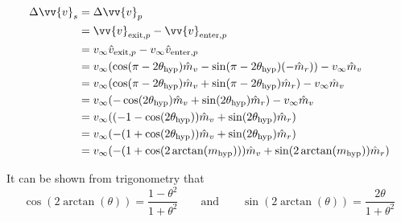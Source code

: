 \documentclass[../main.tex]{subfiles}
\begin{document}
\begin{align*}
    \Delta\vv{v}_s & = \Delta\vv{v}_p                                                                                             \\
                   & = \vv{v}_{\text{exit},p}-\vv{v}_{\text{enter},p}                                                             \\
                   & = v_\infty\hat{v}_{\text{exit},p}-v_\infty\hat{v}_{\text{enter},p}                                           \\
                   & = v_\infty(\cos(\pi-2\theta_\text{hyp})\hat{m}_v-\sin(\pi-2\theta_\text{hyp})(-\hat{m}_r))-v_\infty\hat{m}_v \\
                   & = v_\infty(\cos(\pi-2\theta_\text{hyp})\hat{m}_v+\sin(\pi-2\theta_\text{hyp})\hat{m}_r)-v_\infty\hat{m}_v    \\
                   & = v_\infty(-\cos(2\theta_\text{hyp})\hat{m}_v+\sin(2\theta_\text{hyp})\hat{m}_r)-v_\infty\hat{m}_v           \\
                   & = v_\infty((-1-\cos(2\theta_\text{hyp}))\hat{m}_v+\sin(2\theta_\text{hyp})\hat{m}_r)                         \\
                   & = v_\infty(-(1+\cos(2\theta_\text{hyp}))\hat{m}_v+\sin(2\theta_\text{hyp})\hat{m}_r)                         \\
                   & = v_\infty(-(1+\cos(2\arctan(m_\text{hyp})))\hat{m}_v+\sin(2\arctan(m_\text{hyp}))\hat{m}_r)                 \\
\end{align*}

It can be shown from trigonometry that
$$\cos(2\arctan(\theta))=\frac{1-\theta^2}{1+\theta^2}\qquad\text{and}\qquad\sin(2\arctan(\theta))=\frac{2\theta}{1+\theta^2}$$

\end{document}
